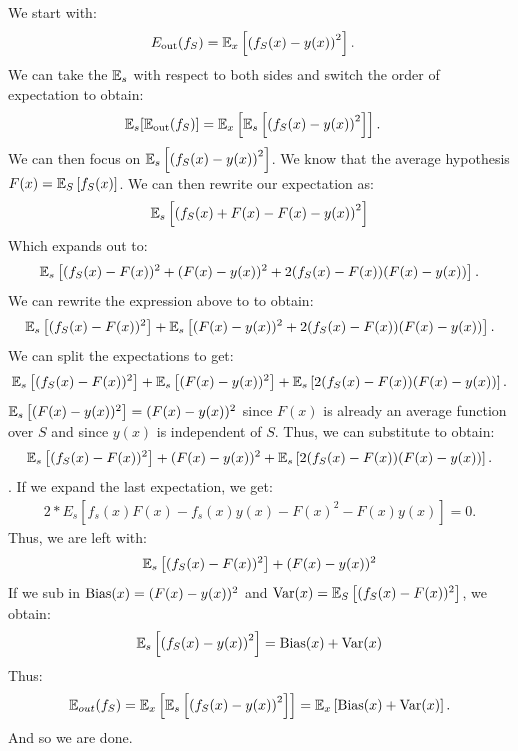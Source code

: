 \begin{solution}
  We start with: 
  \begin{align*}
      E_\text{out}(f_S) &= \mathbb{E}_x\left[\left(f_S(x) - y(x)\right)^2\right].
  \end{align*}
  We can take the $\mathbb{E}_s$ with respect to both sides and switch the order of expectation to obtain:
  \begin{align*}
      \mathbb{E}_s[\mathbb{E}_\text{out}(f_S)] &= \mathbb{E}_x\left[\mathbb{E}_s\left[\left(f_S(x) - y(x)\right)^2\right]\right].      
  \end{align*}
  We can then focus on $\mathbb{E}_s\left[\left(f_S(x) - y(x)\right)^2\right]$. We know that the average hypothesis $F(x) = \mathbb{E}_S\left[f_S(x) \right]$. We can then rewrite our expectation as:
  \begin{align*}
      \mathbb{E}_s\left[\left(f_S(x) + F(x) - F(x) - y(x)\right)^2\right]
  \end{align*}
  Which expands out to:
  \begin{align*}
      \mathbb{E}_s\left[(f_S(x)-F(x))^2 + (F(x)-y(x))^2 + 2(f_S(x)-F(x))(F(x)-y(x))\right].
  \end{align*}
  We can rewrite the expression above to to obtain:
  \begin{align*}
   \mathbb{E}_s\left[(f_S(x)-F(x))^2\right] + \mathbb{E}_s\left[(F(x)-y(x))^2 + 2(f_S(x)-F(x))(F(x)-y(x))\right].
   \end{align*}
  We can split the expectations to get:
  \begin{align*}
   \mathbb{E}_s\left[(f_S(x)-F(x))^2\right] + \mathbb{E}_s\left[(F(x)-y(x))^2\right] + \mathbb{E}_s\left[2(f_S(x)-F(x))(F(x)-y(x))\right].
   \end{align*}
   $\mathbb{E}_s\left[(F(x)-y(x))^2\right] = (F(x)-y(x))^2$ since $F(x)$ is already an average function over $S$ and since $y(x)$ is independent of $S$. Thus, we can substitute to obtain:
   \begin{align*}
   \mathbb{E}_s\left[(f_S(x)-F(x))^2\right] + (F(x)-y(x))^2 + \mathbb{E}_s\left[2(f_S(x)-F(x))(F(x)-y(x))\right].
   \end{align*}.
   If we expand the last expectation, we get:
   \begin{align*}
       2*E_s\left[f_s(x)F(x)-f_s(x)y(x)-F(x)^2-F(x)y(x)\right] = 0.
   \end{align*}
   Thus, we are left with:
   \begin{align*}
   \mathbb{E}_s\left[(f_S(x)-F(x))^2\right] + (F(x)-y(x))^2
   \end{align*}
   If we sub in $ \operatorname{Bias}(x) = (F(x) - y(x))^2$ and $\operatorname{Var}(x) = \mathbb{E}_S\left[(f_S(x)-F(x))^2\right]$, we obtain:
   \begin{align*}
       \mathbb{E}_s\left[\left(f_S(x) - y(x)\right)^2\right] = \operatorname{Bias}(x)+\operatorname{Var}(x)
   \end{align*}
   Thus:
   \begin{align*}
       \mathbb{E}_{out}(f_S) = \mathbb{E}_x\left[\mathbb{E}_s\left[\left(f_S(x) - y(x)\right)^2\right]\right] = \mathbb{E}_x\left[\operatorname{Bias}(x)+\operatorname{Var}(x)\right].
   \end{align*}
   And so we are done.
\end{solution}

